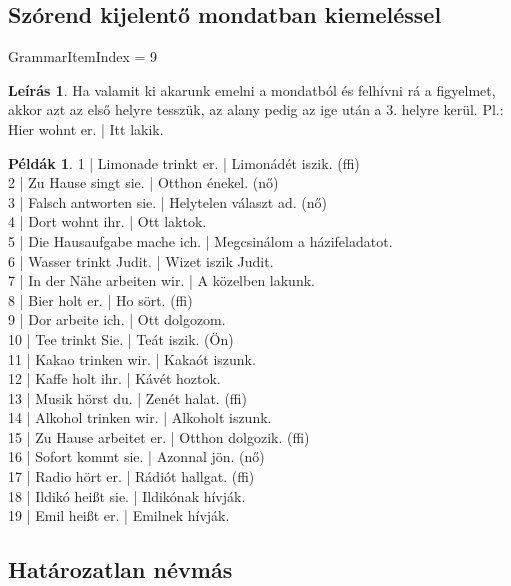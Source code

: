 \documentclass{article}
\theoremstyle{definition}
\newtheorem*{exmp}{Példák}
\newtheorem*{desc}{Leírás}
\begin{document}
\subsection{Szórend kijelentő mondatban kiemeléssel}

GrammarItemIndex = 9

\begin{desc}
Ha valamit ki akarunk emelni a mondatból és felhívni rá a figyelmet,
akkor azt az első helyre tesszük, az alany pedig az ige után a 3. helyre kerül.
Pl.: Hier wohnt er. | Itt lakik.
\end{desc}

\begin{exmp}
1 | Limonade trinkt er. | Limonádét iszik. (ffi)\\
2 | Zu Hause singt sie. | Otthon énekel. (nő)\\
3 | Falsch antworten sie. | Helytelen választ ad. (nő)\\
4 | Dort wohnt ihr. | Ott laktok.\\
5 | Die Hausaufgabe mache ich. | Megcsinálom a házifeladatot.\\
6 | Wasser trinkt Judit. | Wizet iszik Judit.\\
7 | In der Nähe arbeiten wir. | A közelben lakunk.\\
8 | Bier holt er. | Ho sört. (ffi)\\
9 | Dor arbeite ich. | Ott dolgozom.\\
10 | Tee trinkt Sie. | Teát iszik. (Ön)\\
11 | Kakao trinken wir. | Kakaót iszunk.\\
12 | Kaffe holt ihr. | Kávét hoztok.\\
13 | Musik hörst du. | Zenét halat. (ffi)\\
14 | Alkohol trinken wir. | Alkoholt iszunk.\\
15 | Zu Hause arbeitet er. | Otthon dolgozik. (ffi)\\
16 | Sofort kommt sie. | Azonnal jön. (nő)\\
17 | Radio hört er. | Rádiót hallgat. (ffi)\\
18 | Ildikó heißt sie. | Ildikónak hívják.\\
19 | Emil heißt er. | Emilnek hívják.\\
\end{exmp}

\subsection{Határozatlan névmás}
\end{document}
